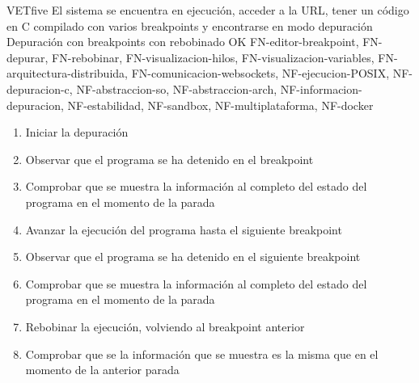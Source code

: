     \begin{testCase}{VET}{five}
        {El sistema se encuentra en ejecución, acceder a la URL, tener un código en C compilado con varios breakpoints y encontrarse en modo depuración}
        {\NA}
        {Depuración con breakpoints con rebobinado}
        {OK}
        {FN-editor-breakpoint, FN-depurar, FN-rebobinar, FN-visualizacion-hilos, FN-visualizacion-variables, FN-arquitectura-distribuida, FN-comunicacion-websockets, NF-ejecucion-POSIX, NF-depuracion-c, NF-abstraccion-so, NF-abstraccion-arch, NF-informacion-depuracion, NF-estabilidad, NF-sandbox, NF-multiplataforma, NF-docker}
        \begin{enumerate}
            \item Iniciar la depuración
            \item Observar que el programa se ha detenido en el breakpoint
            \item Comprobar que se muestra la información al completo del estado del programa en el momento de la parada
            \item Avanzar la ejecución del programa hasta el siguiente breakpoint
            \item Observar que el programa se ha detenido en el siguiente breakpoint
            \item Comprobar que se muestra la información al completo del estado del programa en el momento de la parada
            \item Rebobinar la ejecución, volviendo al breakpoint anterior
            \item Comprobar que se la información que se muestra es la misma que en el momento de la anterior parada
        \end{enumerate}
    \end{testCase}

